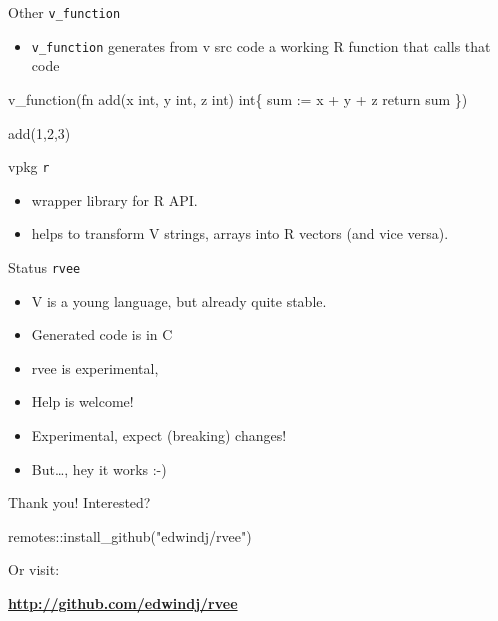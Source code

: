 \documentclass[
  ignorenonframetext,
]{beamer}
\newenvironment{Shaded}{\begin{snugshade}}{\end{snugshade}}
\newcommand{\DecValTok}[1]{\textcolor[rgb]{0.00,0.00,0.81}{#1}}
\newcommand{\FunctionTok}[1]{\textcolor[rgb]{0.00,0.00,0.00}{#1}}
\newcommand{\NormalTok}[1]{#1}
\newcommand{\SpecialCharTok}[1]{\textcolor[rgb]{0.00,0.00,0.00}{#1}}
\newcommand{\StringTok}[1]{\textcolor[rgb]{0.31,0.60,0.02}{#1}}
\providecommand{\tightlist}{%
  \setlength{\itemsep}{0pt}\setlength{\parskip}{0pt}}
\begin{document}
\begin{frame}[fragile]{Other \texttt{v\_function}}
\protect\hypertarget{other-v_function}{}
\begin{itemize}
\tightlist
\item
  \texttt{v\_function} generates from v src code a working R function
  that calls that code
\end{itemize}

\begin{Shaded}
\begin{Highlighting}[]
\FunctionTok{v\_function}\NormalTok{(}\StringTok{\textquotesingle{}fn add(x int, y int, z int) int\{}
\StringTok{  sum := x + y + z}
\StringTok{  return sum}
\StringTok{\}\textquotesingle{}}\NormalTok{)}

\FunctionTok{add}\NormalTok{(}\DecValTok{1}\NormalTok{,}\DecValTok{2}\NormalTok{,}\DecValTok{3}\NormalTok{)}
\end{Highlighting}
\end{Shaded}

\begin{block}{vpkg \texttt{r}}
\protect\hypertarget{vpkg-r}{}
\begin{itemize}
\tightlist
\item
  wrapper library for R API.
\item
  helps to transform V strings, arrays into R vectors (and vice versa).
\end{itemize}
\end{block}
\end{frame}

\begin{frame}{Status \texttt{rvee}}
\protect\hypertarget{status-rvee}{}
\begin{itemize}
\tightlist
\item
  V is a young language, but already quite stable.
\item
  Generated code is in C
\item
  rvee is experimental,
\item
  Help is welcome!
\item
  Experimental, expect (breaking) changes!
\item
  But\ldots, hey it works :-)
\end{itemize}
\end{frame}

\begin{frame}[fragile]{Thank you!}
\protect\hypertarget{thank-you}{}
\Large Interested?

\begin{Shaded}
\begin{Highlighting}[]
\NormalTok{remotes}\SpecialCharTok{::}\FunctionTok{install\_github}\NormalTok{(}\StringTok{"edwindj/rvee"}\NormalTok{)}
\end{Highlighting}
\end{Shaded}

Or visit:

\href{http://github.com/edwindj/rvee}{\textbf{http://github.com/edwindj/rvee}}
\end{frame}
\end{document}
